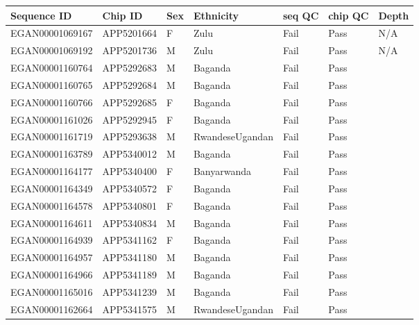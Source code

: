 \begin{table}[htp]
\centering
\begin{tabular}{|l|l|l|l|l|l|l|}
\hline
Sequence ID & Chip ID & Sex & Ethnicity & seq QC & chip QC & Depth \\
\hline
EGAN00001069167 & APP5201664 & F & Zulu & Fail & Pass & N/A \\
EGAN00001069192 & APP5201736 & M & Zulu & Fail & Pass & N/A \\
EGAN00001160764 & APP5292683 & M & Baganda & Fail & Pass &  \\
EGAN00001160765 & APP5292684 & M & Baganda & Fail & Pass &  \\
EGAN00001160766 & APP5292685 & F & Baganda & Fail & Pass &  \\
EGAN00001161026 & APP5292945 & F & Baganda & Fail & Pass &  \\
EGAN00001161719 & APP5293638 & M & RwandeseUgandan & Fail & Pass &  \\
EGAN00001163789 & APP5340012 & M & Baganda & Fail & Pass &  \\
EGAN00001164177 & APP5340400 & F & Banyarwanda & Fail & Pass &  \\
EGAN00001164349 & APP5340572 & F & Baganda & Fail & Pass &  \\
EGAN00001164578 & APP5340801 & F & Baganda & Fail & Pass &  \\
EGAN00001164611 & APP5340834 & M & Baganda & Fail & Pass &  \\
EGAN00001164939 & APP5341162 & F & Baganda & Fail & Pass &  \\
EGAN00001164957 & APP5341180 & M & Baganda & Fail & Pass &  \\
EGAN00001164966 & APP5341189 & M & Baganda & Fail & Pass &  \\
EGAN00001165016 & APP5341239 & M & Baganda & Fail & Pass &  \\
EGAN00001162664 & APP5341575 & M & RwandeseUgandan & Fail &  Pass &  \\

\end{tabular}
\end{table}

